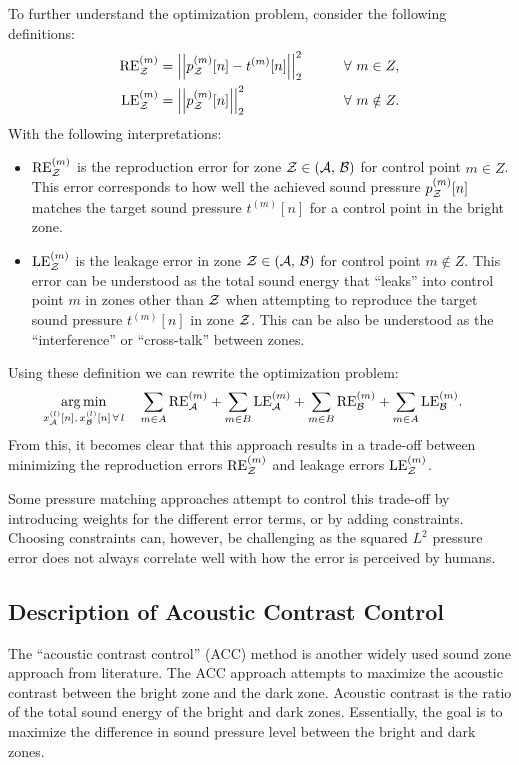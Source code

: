 To further understand the optimization problem, consider the following definitions: 
\begin{alignat}{2}
    \text{RE}^{(m)}_\zz &= \norm[2][2]{p_\zz^{(m)}[n] - t^{(m)}[n]} \qquad&& \forall\,\, m\in Z, \label{eq:sound_zone:approaches:RE}\\
    \text{LE}^{(m)}_\zz &= \norm[2][2]{p_\zz^{(m)}[n]} \qquad&& \forall\,\, m\notin Z. \label{eq:sound_zone:approaches:LE} 
\end{alignat}
With the following interpretations:
\begin{itemize}
    \item $\text{RE}^{(m)}_{\mathcal{Z}}$ is the reproduction error for zone $\mathcal{Z} \in \left(\mathcal{A},\,\mathcal{B}\right)$ 
        for control point $m \in Z$.
        This error corresponds to how well the achieved sound pressure $p_{\mathcal{Z}}^{(m)}[n]$ matches the 
        target sound pressure $t^{(m)}[n]$ for a control point in the 
        bright zone. 
    \item $\text{LE}^{(m)}_{\mathcal{Z}}$ is the leakage error in zone $\mathcal{Z} \in \left(\mathcal{A},\,\mathcal{B}\right)$ for control point $m \notin Z$.
        This error can be understood as the total sound energy that ``leaks'' into control point $m$ in zones 
        other than $\mathcal{Z}$ when attempting to reproduce the target sound pressure $t^{(m)}[n]$ in zone $\mathcal{Z}$. 
        This can be also be understood as the ``interference'' or ``cross-talk'' between zones.
\end{itemize}
Using these definition we can rewrite the optimization problem:
\begin{align}
    \operatorname*{arg\,min}_{x_{\mathcal{A}}^{(l)}[n],\,x_{\mathcal{B}}^{(l)}[n]\,\forall\,l}\quad 
       &\sum_{m\in A} \text{RE}^{(m)}_{\mathcal{A}} +  \sum_{m\in B} \text{LE}^{(m)}_{\mathcal{A}} + \sum_{m\in B} \text{RE}^{(m)}_{\mathcal{B}} + \sum_{m\in A} \text{LE}^{(m)}_{\mathcal{B}}
   .
\end{align}
From this, it becomes clear that this approach results in a trade-off between minimizing the reproduction errors $\text{RE}^{(m)}_{\mathcal{Z}}$ 
and leakage errors $\text{LE}^{(m)}_{\mathcal{Z}}$. 

Some pressure matching approaches attempt to control this trade-off by introducing weights for the different error terms, 
or by adding constraints.
Choosing constraints can, however, be challenging as the squared $L^2$ pressure error does not always correlate well with how
the error is perceived by humans.

\subsection{Description of Acoustic Contrast Control}
\label{ch:sound_zone:approaches:acoustic_contrast_control}
The ``acoustic contrast control'' (ACC) method is another widely used sound zone approach from literature.
The ACC approach attempts to maximize the acoustic contrast between the bright zone and the dark zone. 
Acoustic contrast is the ratio of the total sound energy of the bright and dark zones.
Essentially, the goal is to maximize the difference in sound pressure level between the bright and dark zones.

